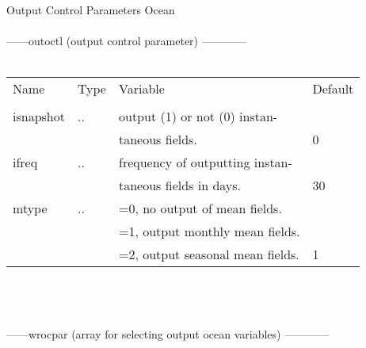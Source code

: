   Output Control Parameters Ocean\\ \\
------outoctl (output control parameter)  ------------          \\
\\
\begin{tabular}{llll}
Name	  &    Type          &	 Variable			  &	Default    \\ 
\\
\hline
isnapshot &    ..            &   output (1) or not (0) instan-    &          \\          
          &                  &   taneous fields.                  &       0  \\ 
ifreq     &    ..            &   frequency of outputting instan-  &          \\ 
          &                  &   taneous fields in days.          &	  30 \\
mtype     &    ..            &   =0, no output of mean fields.                \\ 
          &                  &   =1, output monthly mean fields.             \\
          &                  &   =2, output seasonal mean fields. &	  1  \\  \hline
\end{tabular}
\\
\\
\\
------wrocpar (array for selecting output ocean variables)  ------------          \\
\\
